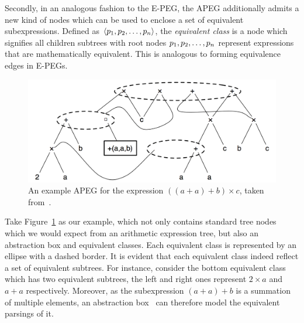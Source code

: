 Secondly, in an analogous fashion to the E-PEG, the APEG additionally
admits a new kind of nodes which can be used to enclose a set of equivalent
subexpressions.  Defined as $\langle p_1, p_2, \mathellipsis, p_n \rangle$,
the \emph{equivalent class} is a node which signifies all children subtrees
with root nodes $p_1, p_2, \mathellipsis, p_n$ represent expressions that are
mathematically equivalent.  This is analogous to forming equivalence edges in
E-PEGs.

\begin{figure}[ht]
    \centering
    \includegraphics[scale=0.4]{bg/fig/apeg.png}
    \caption{%
        An example APEG for the expression $\left( \left( a + a \right) + b
        \right) \times c$, taken from~\cite{martel12}.
    }\label{bg:fig:apeg}
\end{figure}
Take Figure~\ref{bg:fig:apeg} as our example, which not only contains standard
tree nodes which we would expect from an arithmetic expression tree, but
also an abstraction box and equivalent classes.  Each equivalent class is
represented by an ellipse with a dashed border.  It is evident that each
equivalent class indeed reflect a set of equivalent subtrees.  For instance,
consider the bottom equivalent class which has two equivalent subtrees, the
left and right ones represent $2 \times a$ and $a + a$ respectively.  Moreover,
as the subexpression $(a + a) + b$ is a summation of multiple elements, an
abstraction box \, can therefore model the equivalent
parsings of it.

